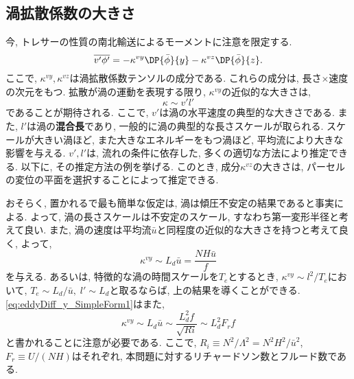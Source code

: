 \subsection{渦拡散係数の大きさ}
今, トレサーの性質の南北輸送によるモーメントに注意を限定する. 
\begin{equation}
 \overline{v' \phi'}
 = - \kappa^{vy} \DP{\bar{\phi}}{y} - \kappa^{vz} \DP{\bar{\phi}}{z}. 
\end{equation}
ここで, $\kappa^{vy}, \kappa^{vz}$は渦拡散係数テンソルの成分である.
これらの成分は, 長さ$\times$速度の次元をもつ. 
拡散が渦の運動を表現する限り, $\kappa^{vy}$の近似的な大きさは,
\begin{equation}
  \kappa \sim v' l'
\end{equation}
であることが期待される.
ここで, $v'$は渦の水平速度の典型的な大きさである.
また, $l'$は渦の\textbf{混合長}であり, 一般的に渦の典型的な長さスケールが取られる.
スケールが大きい渦ほど, また大きなエネルギーをもつ渦ほど, 平均流により大きな影響を与える.
$v', l'$は, 流れの条件に依存した, 多くの適切な方法により推定できる.
以下に, その推定方法の例を挙げる.
このとき, 成分$\kappa^{vz}$の大きさは, パーセルの変位の平面を選択することによって推定できる.

おそらく, 置かれるで最も簡単な仮定は, 渦は傾圧不安定の結果であると事実による.
よって, 渦の長さスケールは不安定のスケール, すなわち第一変形半径と考えて良い.
また, 渦の速度は平均流$\bar{u}$と同程度の近似的な大きさを持つと考えて良く,
よって,
\begin{equation}
 \kappa^{vy} \sim L_d \bar{u} = \dfrac{NH \bar{u}}{f}
 \label{eq:eddyDiff_y_SimpleForm1}
\end{equation}
を与える.
あるいは, 特徴的な渦の時間スケールを$T_e$とするとき, $\kappa^{vy} \sim l^2/T_e$において,
$T_e \sim L_d/\bar{u}, \; l' \sim L_d$と取るならば, 上の結果を導くことができる. 
\eqref{eq:eddyDiff_y_SimpleForm1}はまた,
\begin{equation}
 \kappa^{vy} \sim L_d \bar{u} \sim \dfrac{L_d^2 f}{\sqrt{Ri}}
             \sim L_d^2 F_r f
\end{equation}
と書かれることに注意が必要である. 
ここで, $R_i \equiv N^2/\Lambda^2 = N^2 H^2/\bar{u}^2$, $F_r\equiv U/(NH)$はそれぞれ,
本問題に対するリチャードソン数とフルード数である.

